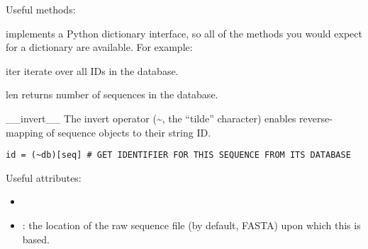 \documentclass{howto}
\begin{document}
Useful methods:

 implements a Python dictionary interface,
so all of the methods you would expect for a dictionary are available.
For example:

\begin{funcdesc}{iter}{}
  iterate over all IDs in the database.
\end{funcdesc}

\begin{funcdesc}{len}{}
  returns number of sequences in the database.
\end{funcdesc}

\begin{funcdesc}{__invert__}{}
  The invert operator (\textasciitilde, the ``tilde'' character) 
  enables reverse-mapping of sequence objects to their string ID.
\begin{verbatim}
id = (~db)[seq] # GET IDENTIFIER FOR THIS SEQUENCE FROM ITS DATABASE
\end{verbatim}
\end{funcdesc}



Useful attributes:
\begin{itemize}

\item
\item
{}: the location of the raw sequence file (by default, FASTA)
upon which this  is based.

\end{itemize}
\end{document}
